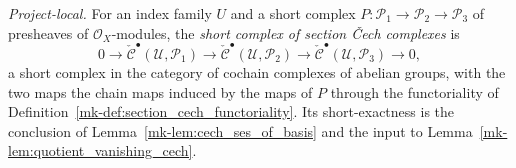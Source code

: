 \begin{definition}\label{mk-def:section_cech_short_complex}
  \leanok

  \textit{Project-local.}
  For an index family \(U\) and a short complex
  \(P : \mathcal{P}_1 \to \mathcal{P}_2 \to \mathcal{P}_3\) of presheaves of
  \(\mathcal{O}_X\)-modules, the \emph{short complex of section {\v C}ech complexes} is
  \[
    0 \to \check{\mathcal{C}}^\bullet(\mathcal{U}, \mathcal{P}_1) \to
      \check{\mathcal{C}}^\bullet(\mathcal{U}, \mathcal{P}_2) \to
      \check{\mathcal{C}}^\bullet(\mathcal{U}, \mathcal{P}_3) \to 0,
  \]
  a short complex in the category of cochain complexes of abelian groups, with the two maps the
  chain maps induced by the maps of \(P\) through the functoriality of
  Definition~\ref{mk-def:section_cech_functoriality}. Its short-exactness is the conclusion of
  Lemma~\ref{mk-lem:cech_ses_of_basis} and the input to Lemma~\ref{mk-lem:quotient_vanishing_cech}.
\end{definition}

